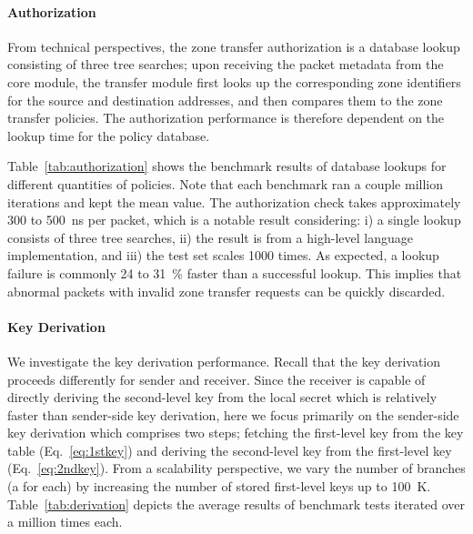 \paragraph{Authorization}
From technical perspectives, the zone transfer authorization is a database lookup consisting 
of three tree searches; 
upon receiving the packet metadata from the core module, the transfer module first looks
up the corresponding zone identifiers for the source and destination addresses, and then 
compares them to the zone transfer policies. The authorization performance is therefore 
dependent on the lookup time for the policy database. 

Table~\ref{tab:authorization} shows
the benchmark results of database lookups for different quantities of policies.
Note that each benchmark ran a couple million iterations and kept the mean value.
The authorization check takes approximately 300 to \SI{500}{ns} per packet, which is a
notable result considering: i) a single lookup consists of three tree searches, ii) the result
is from a high-level language implementation, and iii) the test set scales 1000 times. 
As expected, a lookup failure is commonly 24 to 31~\% faster than a successful lookup.
This implies that abnormal packets with invalid zone transfer requests can be quickly 
discarded. 


\paragraph{Key Derivation}
We investigate the key derivation performance. Recall that the key derivation proceeds
differently for sender and receiver. Since the receiver is capable of directly deriving the
second-level key from the local secret which is relatively faster than sender-side key 
derivation, here we focus primarily on the sender-side key derivation which comprises two steps; 
fetching the first-level key from the key table (Eq.~\ref{eq:1stkey}) and deriving the 
second-level key from the first-level key (Eq.~\ref{eq:2ndkey}). From a scalability 
perspective, we vary the number of branches (a \tp for each) by increasing the number of stored 
first-level keys up to \SI{100}{K}. Table~\ref{tab:derivation} depicts the average results of
benchmark tests iterated over a million times each. 


